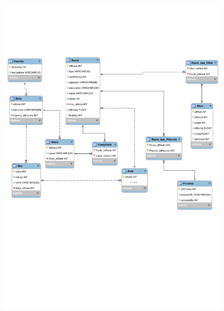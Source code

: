 \documentclass[12pt,letter]{article}
\begin{document}
\FloatBarrier
\begin{figure}[ht!]
    \includegraphics[trim={0 8.5cm 0 4.5cm},clip, width=\textwidth]{ER_Diagram.pdf}
\end{figure}
\end{document}
